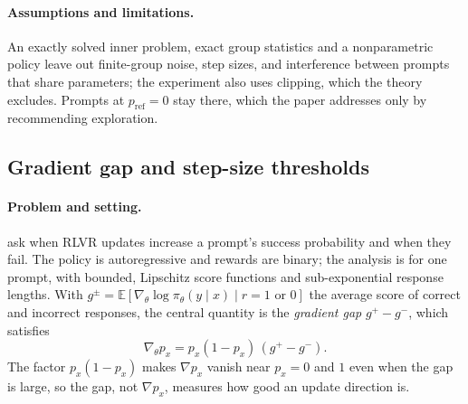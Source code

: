 \documentclass{article}
\theoremstyle{definition}
\newcommand{\E}{\mathbb{E}}
\newcommand{\1}{\mathbf{1}}
\newcommand{\pref}{p_{\mathrm{ref}}}
\begin{document}
\paragraph{Assumptions and limitations.}
An exactly solved inner problem, exact group statistics and a
nonparametric policy leave out finite-group noise, step sizes, and
interference between prompts that share parameters; the experiment also
uses clipping, which the theory excludes. Prompts at $\pref=0$ stay
there, which the paper addresses only by recommending exploration.

\subsection{\texorpdfstring{Gradient gap and step-size thresholds~\citep{suk2025gradientgap}}{Gradient gap and step-size thresholds (Suk and Duan)}}
\label{sec:suk}

\paragraph{Problem and setting.}
\citet{suk2025gradientgap} ask when RLVR updates increase a prompt's
success probability and when they fail. The policy is autoregressive and
rewards are binary; the analysis is for one prompt, with bounded,
Lipschitz score functions and sub-exponential response lengths. With
$g^{\pm}=\E[\nabla_\theta\log\pi_\theta(y\mid x)\mid r=1\text{ or }0]$
the average score of correct and incorrect responses, the central
quantity is the \emph{gradient gap} $g^+-g^-$, which satisfies
\[
  \nabla_\theta p_x=p_x(1-p_x)\,(g^+-g^-).
\]
The factor $p_x(1-p_x)$ makes $\nabla p_x$ vanish near $p_x=0$ and $1$
even when the gap is large, so the gap, not $\nabla p_x$, measures how
good an update direction is.
\end{document}
